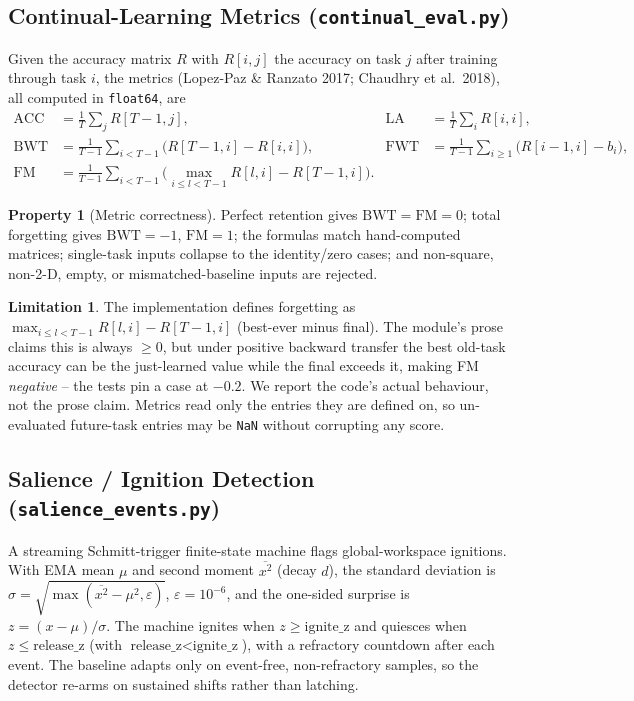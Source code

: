 \documentclass[11pt]{article}
\theoremstyle{definition}
\newtheorem{property}{Property}[section]
\newtheorem{limitation}{Limitation}[section]
\newcommand{\code}[1]{\texttt{#1}}
\newcommand{\eps}{\varepsilon}
\begin{document}
\subsection{Continual-Learning Metrics (\code{continual\_eval.py})}
Given the accuracy matrix $R$ with $R[i,j]$ the accuracy on task $j$ after
training through task $i$, the metrics (Lopez-Paz \& Ranzato 2017; Chaudhry
et al.\ 2018), all computed in \code{float64}, are
\begin{align}
\text{ACC} &= \tfrac1T\textstyle\sum_j R[T{-}1,j], &
\text{LA} &= \tfrac1T\textstyle\sum_i R[i,i],\\
\text{BWT} &= \tfrac1{T-1}\textstyle\sum_{i<T-1}\!\big(R[T{-}1,i]-R[i,i]\big), &
\text{FWT} &= \tfrac1{T-1}\textstyle\sum_{i\ge1}\!\big(R[i{-}1,i]-b_i\big),\\
\text{FM} &= \tfrac1{T-1}\textstyle\sum_{i<T-1}\!\Big(\max_{i\le l<T-1}R[l,i]-R[T{-}1,i]\Big).
\end{align}

\begin{property}[Metric correctness]
Perfect retention gives $\text{BWT}=\text{FM}=0$; total forgetting gives
$\text{BWT}=-1$, $\text{FM}=1$; the formulas match hand-computed matrices;
single-task inputs collapse to the identity/zero cases; and non-square,
non-2-D, empty, or mismatched-baseline inputs are rejected.
\end{property}

\begin{limitation}\label{lim:fm}
The implementation defines forgetting as
$\max_{i\le l<T-1}R[l,i]-R[T{-}1,i]$ (best-ever minus final). The module's
prose claims this is always $\ge 0$, but under positive backward transfer
the best old-task accuracy can be the just-learned value while the final
exceeds it, making FM \emph{negative} -- the tests pin a case at $-0.2$. We
report the code's actual behaviour, not the prose claim. Metrics read only
the entries they are defined on, so un-evaluated future-task entries may be
\code{NaN} without corrupting any score.
\end{limitation}

\subsection{Salience / Ignition Detection (\code{salience\_events.py})}
A streaming Schmitt-trigger finite-state machine flags global-workspace
ignitions. With EMA mean $\mu$ and second moment $\overline{x^2}$ (decay
$d$), the standard deviation is
$\sigma=\sqrt{\max(\overline{x^2}-\mu^2,\eps)}$, $\eps=10^{-6}$, and the
one-sided surprise is $z=(x-\mu)/\sigma$. The machine ignites when
$z\ge\text{ignite\_z}$ and quiesces when $z\le\text{release\_z}$ (with
$\text{release\_z}<\text{ignite\_z}$), with a refractory countdown after
each event. The baseline adapts only on event-free, non-refractory samples,
so the detector re-arms on sustained shifts rather than latching.
\end{document}
